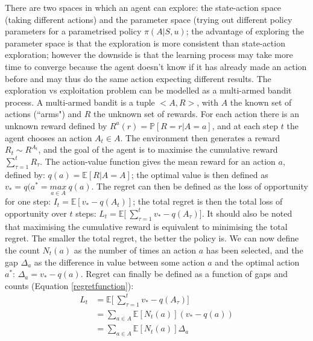 There are two spaces in which an agent can explore: the state-action space (taking different actions) and the parameter space (trying out different policy parameters for a parametrised policy $\pi(A|S,u)$; the advantage of exploring the parameter space is that the exploration is more consistent than state-action exploration; however the downside is that the learning process may take more time to converge because the agent doesn't know if it has already made an action before and may thus do the same action expecting different results. \newline
The exploration vs exploitation problem can be modelled as a multi-armed bandit process. A multi-armed bandit is a tuple $<A,R>$, with $A$ the known set of actions (``arms") and $R$ the unknown set of rewards. For each action there is an unknown reward defined by $R^{a}(r) = \mathbb{P}\left[R=r|A=a\right]$, and at each step $t$ the agent chooses an action $A_t \in A$. The environment then generates a reward $R_t \sim R^{A_t}$, and the goal of the agent is to maximise the cumulative reward $\sum_{\tau=1}^{t}R_{\tau}$. The action-value function gives the mean reward for an action $a$, defined by: $q(a)=\mathbb{E} \left[R|A=A\right]$; the optimal value is then defined as $v_*=q(a^{*}=\underset{a \in A}{max} \: q(a)$. The regret can then be defined as the loss of opportunity for one step: $I_t = \mathbb{E} \left[ v_* - q(A_t)\right]$; the total regret is then the total loss of opportunity over $t$ steps: $L_t = \mathbb{E} \Biggl[ \: \sum\limits_{\tau=1}^{t} v_* - q(A_{\tau})\Biggr]$. It should also be noted that maximising the cumulative reward is equivalent to minimising the total regret. The smaller the total regret, the better the policy is. \newline
We can now define the count $N_t(a)$ as the number of times an action $a$ has been selected, and the gap $\Delta_a$ as the difference in value between some action $a$ and the optimal action $a^{*}$: $\Delta_a = v_* - q(a)$. Regret can finally be defined as a function of gaps and counts (Equation \ref{regretfunction}): 
\begin{equation}
\label{regretfunction}
	\begin{split}
		L_t & = \mathbb{E} \Biggl[ \: \sum\limits_{\tau=1}^{t} v_* - q(A_{\tau})\Biggr] \\
		& = \sum\limits_{a \in A} \mathbb{E}\left[N_t(a)\right](v_*-q(a)) \\
		& = \sum\limits_{a \in A}\mathbb{E}\left[N_t(a)\right]\Delta_a
	\end{split}
\end{equation}


